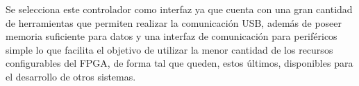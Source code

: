 




Se selecciona este controlador como interfaz ya que cuenta con una gran cantidad de herramientas que permiten realizar la comunicación USB, además de poseer memoria suficiente para datos y una interfaz de comunicación para periféricos simple lo que facilita el objetivo de utilizar la menor cantidad de los recursos configurables del FPGA, de forma tal que queden, estos últimos, disponibles para el desarrollo de otros sistemas.%
